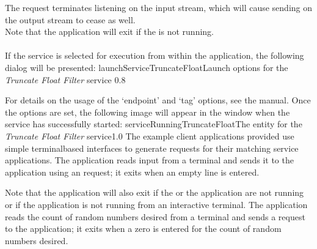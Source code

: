 The  request terminates listening
on the input stream, which will cause sending on the output stream to cease as well.\\

Note that the application will exit if the  is not
running.\\

\insertAppParameters
{}
\insertFilterServiceComment\\

\insertStandardServiceCommands
\condPage{}
If the service is selected for execution from within the \emph{\MMMU} application, the
following dialog will be presented:
%
{launchServiceTruncateFloat}{Launch options for the \emph{Truncate Float Filter} service}%
{0.8}

For details on the usage of the `endpoint' and `tag' options, see the \emph{\MMMU} manual.
Once the options are set, the following image will appear in the \emph{\MMMU} window when
the service has successfully started:
%
{serviceRunningTruncateFloat}{The \emph{\MMMU} entity for the \emph{Truncate Float Filter}
service}{1.0}
\secondaryEnd
\condPage
{}
The example client applications provided use simple terminal\longDash{}based interfaces to
generate requests for their matching service applications.
The  application reads input from a terminal and
sends it to the  application using an
 request; it exits when an empty line is
entered.\\

\insertShortClientParameters{}

Note that the application will also exit if the  or the
 application are not running or if the application
is not running from an interactive terminal.
The  application reads the count of
random numbers desired from a terminal and sends a
 request to the
 application; it exits when a zero is
entered for the count of random numbers desired.

